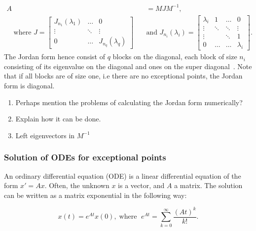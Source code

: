 \documentclass[../main.tex]{subfiles}
\begin{document}
\begin{equation}
\begin{aligned}
    A &= MJM^{-1}, \\ \quad \text{where } J = \begin{bmatrix}J_{n_1}(\lambda_1) & \dots & 0 \\
                                                         \vdots & \ddots & \vdots \\
                                                         0 & \dots &  J_{n_q}(\lambda_q)\end{bmatrix} \quad
      &\text{and } J_{n_i}(\lambda_i) = \begin{bmatrix} \lambda_i & 1 & \dots & 0 \\
                                                                                        \vdots  & \ddots & \ddots & \vdots \\
                                                                                        \vdots & & \ddots& 1 \\
                                                                                        0 & \dots & \dots & \lambda_i\end{bmatrix}.
\end{aligned}
\end{equation}
The Jordan form hence consist of $q$ blocks on the diagonal, each block of size $n_i$ consisting of its eigenvalue on the diagonal and ones on the super diagonal~\cite{uffe}. Note that if all blocks are of size one, i.e there are no exceptional points, the Jordan form is diagonal.
\begin{enumerate}
    \item Perhaps mention the problems of calculating the Jordan form numerically?
    \item Explain how it can be done.
    \item Left eigenvectors in $M^{-1}$
\end{enumerate}

\subsubsection{Solution of ODEs for exceptional points}
An ordinary differential equation (ODE) is a linear differential equation of the form $x'=Ax$. Often, the unknown $x$ is a vector, and $A$ a matrix. The solution can be written as a matrix exponential in the following way:

\begin{equation}
    x(t) = e^{At}x(0), \;\text{where } \;e^{At} = \sum_{k=0}^{\infty}\frac{(At)^k}{k!}.
\end{equation}
\end{document}
